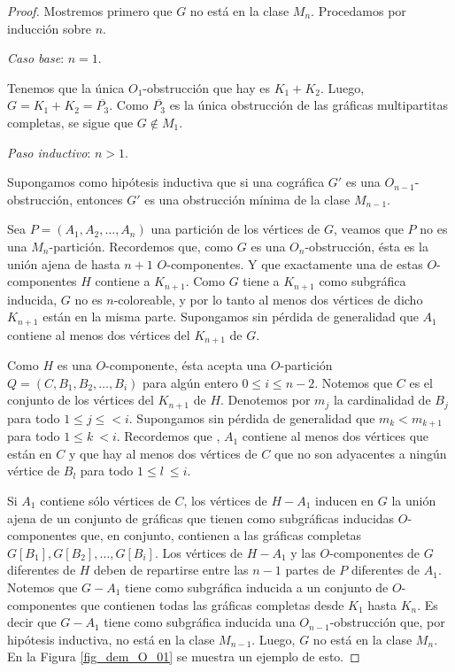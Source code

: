 \begin{proof}
Mostremos primero que $G$ no está en la clase $M_n$. Procedamos por inducción sobre $n$.

\emph{Caso base}: $n=1$.

Tenemos que la única $O_1$-obstrucción que hay es $K_1+K_2$. Luego, $G=K_1+K_2=\overline{P_3}$. Como $\overline{P_3}$ es la única obstrucción de las gráficas multipartitas completas, se sigue que $G\notin M_1$.

\emph{Paso inductivo}: $n>1$.

Supongamos como hipótesis inductiva que si una cográfica $G'$ es una $O_{n-1}$-obstrucción, entonces $G'$ es una obstrucción mínima de la clase $M_{n-1}$.

Sea $P = (A_1, A_2, \dots, A_n)$ una partición de los vértices de $G$, veamos que $P$ no es una $M_n$-partición. Recordemos que, como $G$ es una $O_n$-obstrucción, ésta es la unión ajena de hasta $n+1$ $O$-componentes. Y que exactamente una de estas $O$-componentes $H$ contiene a $K_{n+1}$. Como $G$ tiene a $K_{n+1}$ como subgráfica inducida, $G$ no es $n$-coloreable, y por lo tanto al menos dos vértices de dicho $K_{n+1}$ están en la misma parte. Supongamos sin pérdida de generalidad que $A_1$ contiene al menos dos vértices del $K_{n+1}$ de $G$. 

Como $H$ es una $O$-componente, ésta acepta una $O$-partición $Q=(C,B_1,B_2,\dots,B_i)$ para algún entero $0\le i \le n-2$. Notemos que $C$ es el conjunto de los vértices del $K_{n+1}$ de $H$. Denotemos por $m_j$ la cardinalidad de $B_j$ para todo $1\le j\le < i$. Supongamos sin pérdida de generalidad que $m_k < m_{k+1}$ para todo $1\le k\ < i$. Recordemos que , $A_1$ contiene al menos dos vértices que están en $C$ y que hay al menos dos vértices de $C$ que no son adyacentes a ningún vértice de $B_l$ para todo $1\le l\ \le i$. 

Si $A_1$ contiene sólo vértices de $C$, los vértices de $H-A_1$ inducen en $G$ la unión ajena de un conjunto de gráficas que tienen como subgráficas inducidas $O$-componentes que, en conjunto, contienen a las gráficas completas $G[B_1], G[B_2],\dots,G[B_i]$. Los vértices de $H-A_1$ y las $O$-componentes de $G$ diferentes de $H$ deben de repartirse entre las $n-1$ partes de $P$ diferentes de $A_1$. Notemos que $G-A_1$ tiene como subgráfica inducida a un conjunto de $O$-componentes que contienen todas las gráficas completas desde $K_1$ hasta $K_{n}$. Es decir que $G-A_1$ tiene como subgráfica inducida una $O_{n-1}$-obstrucción que, por hipótesis inductiva, no está en la clase $M_{n-1}$. Luego, $G$ no está en la clase $M_n$. En la Figura \ref{fig_dem_O_01} se muestra un ejemplo de esto.


\end{proof}
